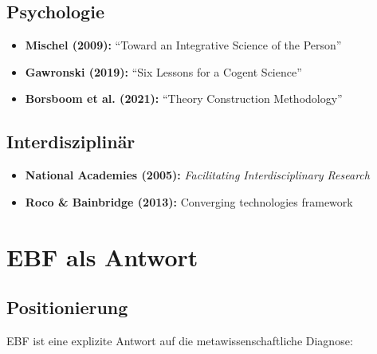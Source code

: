 \documentclass[12pt,a4paper]{article}
\begin{document}
\subsection{Psychologie}

\begin{itemize}[nosep]
\item \textbf{Mischel (2009):} ``Toward an Integrative Science of the Person''
\item \textbf{Gawronski (2019):} ``Six Lessons for a Cogent Science''
\item \textbf{Borsboom et al. (2021):} ``Theory Construction Methodology''
\end{itemize}

\subsection{Interdisziplinär}

\begin{itemize}[nosep]
\item \textbf{National Academies (2005):} \textit{Facilitating Interdisciplinary Research}
\item \textbf{Roco \& Bainbridge (2013):} Converging technologies framework
\end{itemize}

\section{EBF als Antwort}

\subsection{Positionierung}

EBF ist eine explizite Antwort auf die metawissenschaftliche Diagnose:
\end{document}
